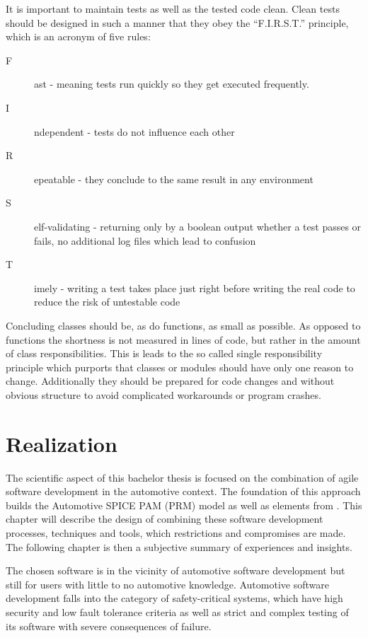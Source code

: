 It is important to maintain tests as well as the tested code clean. Clean tests should be designed in such a manner that they obey the “F.I.R.S.T.” principle, 
which is an acronym of five rules:

\begin{description}
 \item [F]ast - meaning tests run quickly so they get executed frequently.
 \item [I]ndependent - tests do not influence each other
 \item [R]epeatable - they conclude to the same result in any environment
 \item [S]elf-validating - returning only by a boolean output whether a test passes or fails, no additional log files which lead to confusion
 \item [T]imely - writing a test takes place just right before writing the real code to reduce the risk of untestable code
\end{description}

Concluding classes should be, as do functions, as small as possible. As opposed to functions the shortness is not measured in lines of code, but 
rather in the amount of class responsibilities. This is leads to the so called single responsibility principle which purports that classes or modules 
should have only one reason to change. Additionally they should be prepared for code changes and without obvious structure to avoid complicated workarounds
or program crashes.

\section{Realization}

The scientific aspect of this bachelor thesis is focused on the combination of agile software development in the automotive context. The 
foundation of this approach builds the Automotive SPICE PAM (PRM) model as well as elements from \citeauthor{BECK} . 
This chapter will describe the design of combining these software development processes, techniques and tools, which restrictions  
and compromises are made. The following chapter  is then a subjective summary of experiences and insights.

The chosen software is in the vicinity of automotive software development but still for users with little to no automotive knowledge. 
Automotive software development falls into the category of safety-critical systems, which have high 
security and low fault tolerance criteria as well as strict and complex testing of its software with severe consequences of failure.

